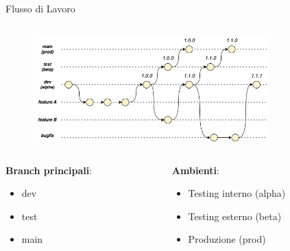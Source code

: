 \begin{frame}{Flusso di Lavoro}
    \begin{columns}[onlytextwidth]
        \begin{column}{0.95\textwidth}
        
            \begin{figure}[H]
                \includegraphics[width=0.85\textwidth]{img/branching-model.png}
            \end{figure}
            
        \end{column}
        \begin{column}{0.05\textwidth}
        \end{column}
    \end{columns}
    
    \vspace{3mm}
    
    \begin{columns}[onlytextwidth]
        \begin{column}{0.4\textwidth}
        
            \textbf{Branch principali}:
            \begin{itemize}
                \item dev
                \item test
                \item main
            \end{itemize}
            
        \end{column}
        \begin{column}{0.4\textwidth}
        
            \textbf{Ambienti}:
            \begin{itemize}
                \item Testing interno (alpha)
                \item Testing esterno (beta)
                \item Produzione (prod)
            \end{itemize}
            
        \end{column}
    \end{columns}
\end{frame}

